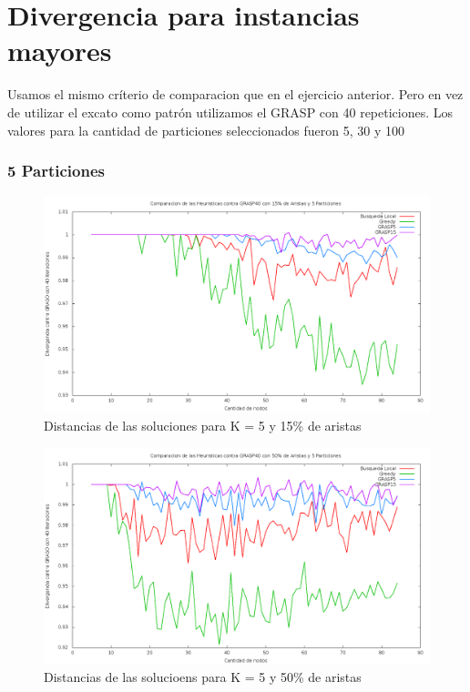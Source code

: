 \section{Divergencia para instancias mayores}

Usamos el mismo cr\'iterio de comparacion que en el ejercicio anterior. Pero en vez de utilizar el excato como patr\'on utilizamos el GRASP con 40 repeticiones. Los valores para la cantidad de particiones seleccionados fueron 5, 30 y 100

\subsubsection{5 Particiones}

\begin{figure}[H]
\begin{center}
\includegraphics[scale=0.3]{finales/muchosComparacionesCon5Particiones15Aristas.png}
\caption{Distancias de las soluciones para K = 5 y 15\% de aristas}
\end{center}
\end{figure}

\begin{figure}[H]
\begin{center}
\includegraphics[scale=0.3]{finales/muchosComparacionesCon5Particiones50Aristas.png}
\caption{Distancias de las solucioens para K = 5 y 50\% de aristas}
\end{center}
\end{figure}

